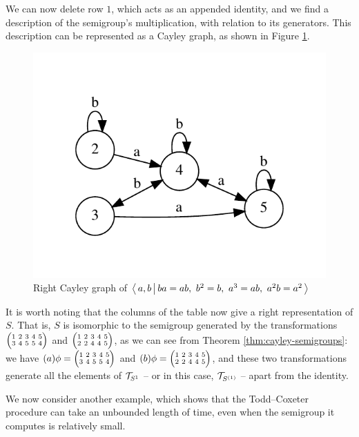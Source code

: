\begin{example}
We can now delete row $1$, which acts as an appended identity, and we find a
description of the semigroup's multiplication, with relation to its generators.
This description can be represented as a Cayley graph,
as shown in Figure \ref{fig:tc-cayley-graph}.
\begin{figure}[H]
  \centering
  \vspace{-4.0em}
  \includegraphics{pics/ch-pairs/tc-cayley-graph}
  \vspace{-4.0em}
  \caption[Todd--Coxeter example: right Cayley graph]
  {Right Cayley graph of $\left\langle \, a, b \, \middle| \, ba=ab,\ b^2=b,\ a^3=ab,\ a^2b=a^2 \, \right\rangle$}
  \label{fig:tc-cayley-graph}
\end{figure}
It is worth noting that the columns of the table now give a right representation
of $S$.  That is, $S$ is isomorphic to the semigroup generated by the
transformations $\transV 34554$ and $\transV 22445$, as we can see from Theorem
\ref{thm:cayley-semigroups}: we have $(a)\phi = \transV 34554$ and
$(b)\phi = \transV 22445$, and these two transformations generate all the
elements of $\mathcal{T}_{S^1}$ -- or in this case, $\mathcal{T}_{S^{(1)}}$ -- apart from the identity.
\end{example}

We now consider another example, which shows that the Todd--Coxeter procedure can
take an unbounded length of time, even when the semigroup it computes is
relatively small.

